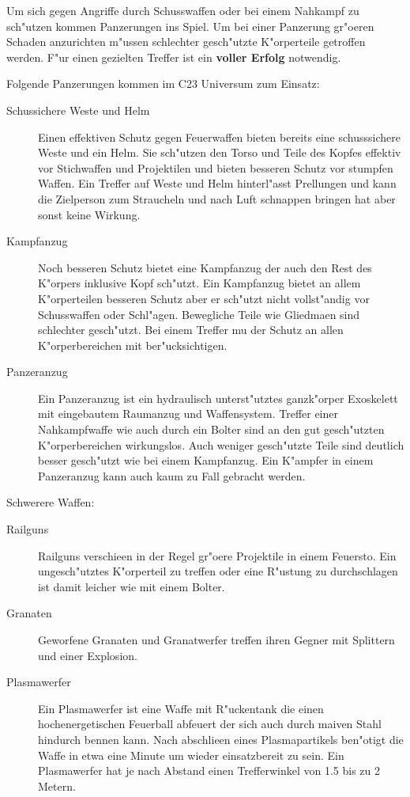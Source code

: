 Um sich gegen Angriffe durch Schusswaffen oder bei einem Nahkampf zu sch"utzen kommen Panzerungen ins Spiel. Um bei einer Panzerung gr"o\3eren Schaden anzurichten m"ussen schlechter gesch"utzte K"orperteile getroffen werden. F"ur einen gezielten Treffer ist ein \textbf{voller Erfolg} notwendig.

Folgende Panzerungen kommen im C23 Universum zum Einsatz:

\begin{description}
    \item[Schussichere Weste und Helm] Einen effektiven Schutz gegen Feuerwaffen bieten bereits eine schusssichere Weste und ein Helm. Sie 
        sch"utzen den Torso und Teile des Kopfes effektiv vor Stichwaffen und Projektilen und bieten besseren Schutz vor stumpfen Waffen. Ein Treffer auf Weste und Helm hinterl"asst Prellungen und kann die Zielperson zum Straucheln und nach Luft schnappen bringen hat aber sonst keine Wirkung.
    \item[Kampfanzug] Noch besseren Schutz bietet eine Kampfanzug der auch den Rest des K"orpers inklusive Kopf sch"utzt. Ein Kampfanzug 
        bietet an allem K"orperteilen besseren Schutz aber er sch"utzt nicht vollst"andig vor Schusswaffen oder Schl"agen. Bewegliche Teile wie Gliedma\3en sind schlechter gesch"utzt. Bei einem Treffer mu\3 der Schutz an allen K"orperbereichen mit ber"ucksichtigen.
    \item[Panzeranzug] Ein Panzeranzug ist ein hydraulisch unterst"utztes ganzk"orper Exoskelett mit eingebautem Raumanzug und 
        Waffensystem. Treffer einer Nahkampfwaffe wie auch durch ein Bolter sind an den gut gesch"utzten K"orperbereichen wirkungslos. Auch weniger gesch"utzte Teile sind deutlich besser gesch"utzt wie bei einem Kampfanzug. Ein K"ampfer in einem Panzeranzug kann auch kaum zu Fall gebracht werden.
\end{description}

Schwerere Waffen:

\begin{description}
    \item[Railguns] Railguns verschie\3en in der Regel gr"o\3ere Projektile in einem Feuersto\3. Ein ungesch"utztes K"orperteil zu treffen 
        oder eine R"ustung zu durchschlagen ist damit leicher wie mit einem Bolter.
    \item[Granaten] Geworfene Granaten und Granatwerfer treffen ihren Gegner mit Splittern und einer Explosion.
    \item[Plasmawerfer] Ein Plasmawerfer ist eine Waffe mit R"uckentank die einen hochenergetischen Feuerball abfeuert der sich auch durch 
        ma\3iven Stahl hindurch bennen kann. Nach abschlie\3en eines Plasmapartikels ben"otigt die Waffe in etwa eine Minute um wieder einsatzbereit zu sein. Ein Plasmawerfer hat je nach Abstand einen Trefferwinkel von 1.5 bis zu 2 Metern.
\end{description}

